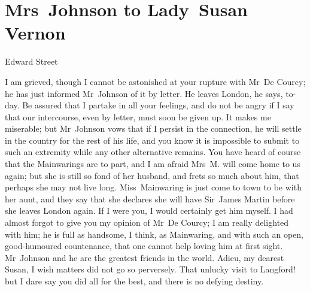 \chapter{Mrs~Johnson to Lady~Susan Vernon}
  
  \begin{mail}{Edward Street}{}

I am grieved, though I cannot be astonished at your rupture with Mr~De Courcy; he has just informed Mr~Johnson of it by letter. He leaves London, he says, to-day. Be assured that I partake in all your feelings, and do not be angry if I say that our intercourse, even by letter, must soon be given up. It makes me miserable; but Mr~Johnson vows that if I persist in the connection, he will settle in the country for the rest of his life, and you know it is impossible to submit to such an extremity while any other alternative remains. You have heard of course that the Mainwarings are to part, and I am afraid Mrs~M. will come home to us again; but she is still so fond of her husband, and frets so much about him, that perhaps she may not live long. Miss~Mainwaring is just come to town to be with her aunt, and they say that she declares she will have Sir~James Martin before she leaves London again. If I were you, I would certainly get him myself. I had almost forgot to give you my opinion of Mr~De Courcy; I am really delighted with him; he is full as handsome, I think, as Mainwaring, and with such an open, good-humoured countenance, that one cannot help loving him at first sight. Mr~Johnson and he are the greatest friends in the world. Adieu, my dearest Susan, I wish matters did not go so perversely. That unlucky visit to Langford! but I dare say you did all for the best, and there is no defying destiny. 

\end{mail}